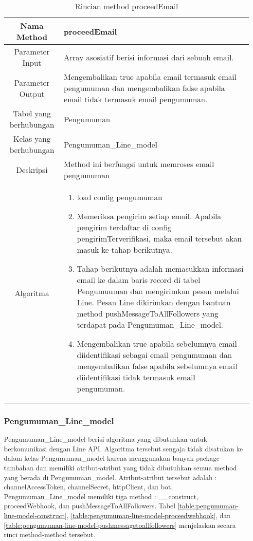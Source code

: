\begin{center}
	\begin{table}[H]
	\caption{Rincian method proceedEmail}
	\label{table:pengumuman-model-proceedemail}
\begin{tabular}{|c|p{11cm}|}
\hline
Nama Method 	& 	 proceedEmail	\\
\hline
Parameter Input & Array asosiatif berisi informasi dari sebuah email. \\
\hline
Parameter Output & Mengembalikan true apabila email termasuk email pengumuman dan mengembalikan false apabila email tidak termasuk email pengumuman.  \\
\hline
Tabel yang berhubungan & Pengumuman \\
\hline
Kelas yang berhubungan &  Pengumuman\_Line\_model \\
\hline
Deskripsi	& Method ini berfungsi untuk memroses email pengumuman\\
\hline
Algoritma	& \begin{enumerate}
				\item load config pengumuman
				\item Memeriksa pengirim setiap email. Apabila pengirim terdaftar di config pengirimTerverifikasi, maka email tersebut akan masuk ke tahap berikutnya.
				\item Tahap berikutnya adalah memasukkan informasi email ke dalam baris record di tabel Pengumuuman dan mengirimkan pesan melalui Line. Pesan Line dikirimkan dengan bantuan method pushMessageToAllFollowers yang terdapat pada Pengumuman\_Line\_model.
				\item Mengembalikan true apabila sebelumnya email diidentifikasi sebagai  email pengumuman dan mengembalikan false apabila sebelumnya email diidentifikasi tidak termasuk email pengumuman.
				\end{enumerate} \\
\hline
\end{tabular}
\end{table}
\end{center}

\subsubsection{Pengumuman\_Line\_model}
Pengumuman\_Line\_model berisi algoritma yang dibutuhkan untuk berkomunikasi dengan Line API. Algoritma tersebut sengaja tidak disatukan ke dalam kelas Pengumuman\_model karena menggunakan banyak package tambahan dan memiliki atribut-atribut yang tidak dibutuhkan semua method yang berada di Pengumuman\_model. Atribut-atribut tersebut adalah : \textdollar channelAccessToken, \textdollar channelSecret, \textdollar httpClient, dan \textdollar bot. Pengumuman\_Line\_model memiliki tiga method : \_\_construct, proceedWebhook, dan pushMessageToAllFollowers. Tabel \ref{table:pengumuman-line-model-construct}, \ref{table:pengumuman-line-model-proceedwebhook}, dan \ref{table:pengumuman-line-model-pushmessagetoallfollowers} menjelaskan secara rinci method-method tersebut.


